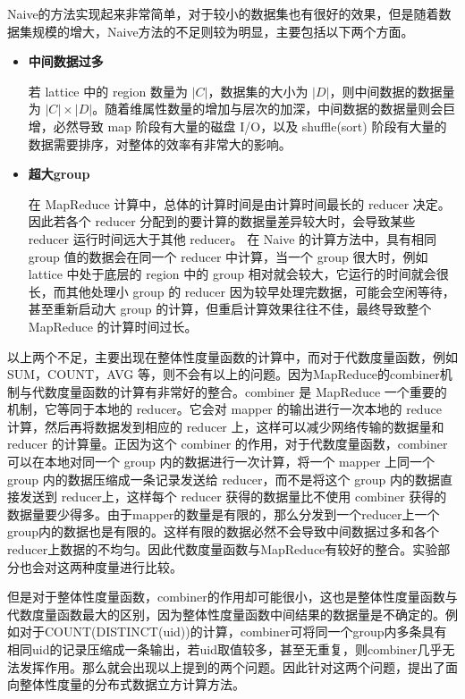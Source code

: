 Naive的方法实现起来非常简单，对于较小的数据集也有很好的效果，但是随着数据集规模的增大，Naive方法的不足则较为明显，主要包括以下两个方面。

\begin{itemize}

\item \textbf{中间数据过多}

若 lattice 中的 region 数量为 $|C|$，数据集的大小为 $|D|$，则中间数据的数据量为 $|C|\times |D|$。随着维属性数量的增加与层次的加深，中间数据的数据量则会巨增，必然导致 map 阶段有大量的磁盘 I/O，以及 shuffle(sort) 阶段有大量的数据需要排序，对整体的效率有非常大的影响。

\item \textbf{超大group}

在 MapReduce 计算中，总体的计算时间是由计算时间最长的 reducer 决定。因此若各个 reducer 分配到的要计算的数据量差异较大时，会导致某些 reducer 运行时间远大于其他 reducer。 在 Naive 的计算方法中，具有相同 group 值的数据会在同一个 reducer 中计算，当一个 group 很大时，例如 lattice 中处于底层的 region 中的 group 相对就会较大，它运行的时间就会很长，而其他处理小 group 的 reducer 因为较早处理完数据，可能会空闲等待，甚至重新启动大 group 的计算，但重启计算效果往往不佳，最终导致整个 MapReduce 的计算时间过长。

\end{itemize}

以上两个不足，主要出现在整体性度量函数的计算中，而对于代数度量函数，例如SUM，COUNT，AVG 等，则不会有以上的问题。因为MapReduce的combiner机制与代数度量函数的计算有非常好的整合。combiner 是 MapReduce 一个重要的机制，它等同于本地的 reducer。它会对 mapper 的输出进行一次本地的 reduce 计算，然后再将数据发到相应的 reducer 上，这样可以减少网络传输的数据量和reducer 的计算量。正因为这个 combiner 的作用，对于代数度量函数，combiner 可以在本地对同一个 group 内的数据进行一次计算，将一个 mapper 上同一个 group 内的数据压缩成一条记录发送给 reducer，而不是将这个 group 内的数据直接发送到 reducer上，这样每个 reducer 获得的数据量比不使用 combiner 获得的数据量要少得多。由于mapper的数量是有限的，那么分发到一个reducer上一个group内的数据也是有限的。这样有限的数据必然不会导致中间数据过多和各个reducer上数据的不均匀。因此代数度量函数与MapReduce有较好的整合。实验部分也会对这两种度量进行比较。

但是对于整体性度量函数，combiner的作用却可能很小，这也是整体性度量函数与代数度量函数最大的区别，因为整体性度量函数中间结果的数据量是不确定的。例如对于COUNT(DISTINCT(uid))的计算，combiner可将同一个group内多条具有相同uid的记录压缩成一条输出，若uid取值较多，甚至无重复，则combiner几乎无法发挥作用。那么就会出现以上提到的两个问题。因此针对这两个问题，\cite{nandi2011distributed}提出了面向整体性度量的分布式数据立方计算方法。



